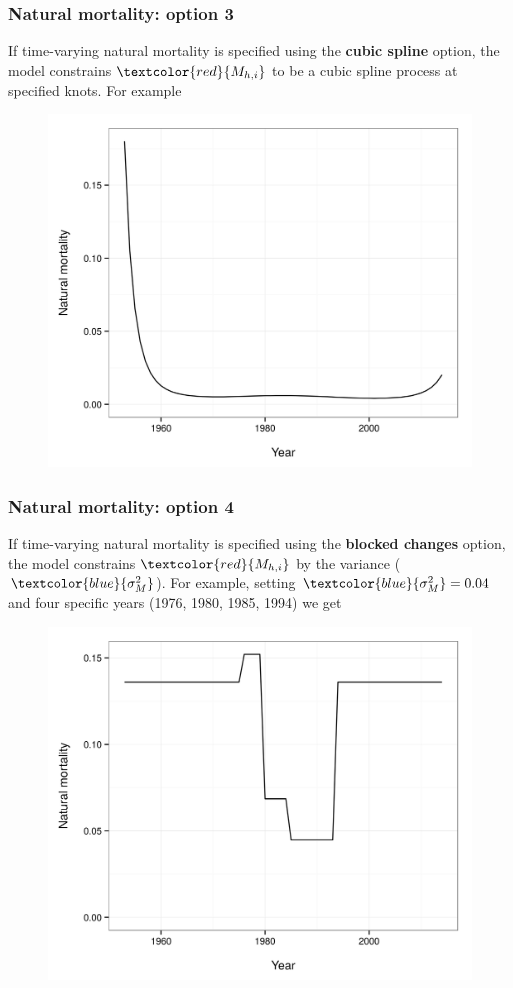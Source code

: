 \documentclass{beamer}
\begin{document}
\begin{frame}
\frametitle{Natural mortality: option 3}
If time-varying natural mortality is specified using the {\bf cubic spline}
option, the model constrains $\textcolor{red}{M_{h,i}}$ to be a cubic spline process at
specified knots. For example
\begin{figure}[!htbp]
  \centering
  \includegraphics[width=0.65\linewidth]{figure/M_t_spline.png}
\end{figure}
\end{frame}


\begin{frame}
\frametitle{Natural mortality: option 4}
If time-varying natural mortality is specified using the {\bf blocked changes}
option, the model constrains $\textcolor{red}{M_{h,i}}$ by the variance
($\textcolor{blue}{\sigma^2_M}$). For example, setting
$\textcolor{blue}{\sigma^2_M} = 0.04$ and four specific years (1976, 1980, 1985,
1994) we get
\begin{figure}[!htbp]
  \centering
  \includegraphics[width=0.65\linewidth]{figure/M_t_block.png}
\end{figure}
\end{frame}
\end{document}
